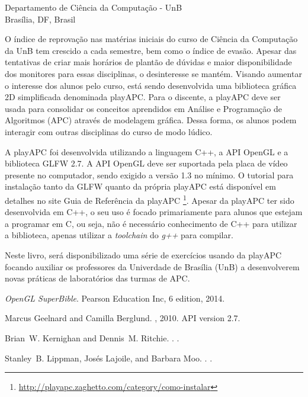 \documentclass{wileySix}
\begin{document}
\begin{introduction}


{Departamento de Ciência da Computação - UnB\\
Brasília, DF, Brasil}

O índice de reprovação nas matérias iniciais do curso de Ciência da Computação da UnB tem crescido a cada semestre, bem como o índice de evasão. Apesar das tentativas de criar mais horários de plantão de dúvidas e maior disponibilidade dos monitores para essas disciplinas, o desinteresse se mantém. Visando aumentar o interesse dos alunos pelo curso, está sendo desenvolvida uma biblioteca gráfica 2D simplificada denominada playAPC.
Para o discente, a playAPC deve ser usada para consolidar os conceitos aprendidos em Análise e Programação de Algoritmos (APC) através de modelagem gráfica. Dessa forma, os alunos podem interagir com outras disciplinas do curso de modo lúdico. 

A playAPC foi desenvolvida utilizando a linguagem C++, a API OpenGL e a biblioteca GLFW 2.7. A API OpenGL deve ser suportada pela placa de vídeo presente no computador, sendo exigido a versão 1.3 no mínimo. O tutorial para instalação tanto da GLFW quanto da própria playAPC está disponível em detalhes no site Guia de Referência da playAPC \footnote{\url{http://playapc.zaghetto.com/category/como-instalar}}. Apesar da playAPC ter sido desenvolvida em C++, o seu uso é focado primariamente para alunos que estejam a programar em C, ou seja, não é necessário conhecimento de C++ para utilizar a biblioteca, apenas utilizar a \emph{toolchain} do \emph{g++} para compilar.

Neste livro, será disponibilizado uma série de exercícios usando da playAPC focando auxiliar os professores da Univerdade de Brasília (UnB) a desenvolverem novas práticas de laboratórios das turmas de APC.

\begin{chapreferences}{1}

{\em OpenGL SuperBible}.
\newblock Pearson Education Inc, 6 edition, 2014.

Marcus Geelnard and Camilla Berglund.
, 2010.
\newblock API version 2.7.

Brian~W. Kernighan and Dennis~M. Ritchie.
.
.

Stanley~B. Lippman, Josés Lajoile, and Barbara Moo.
.
.
\end{chapreferences}
\end{introduction}
\end{document}
